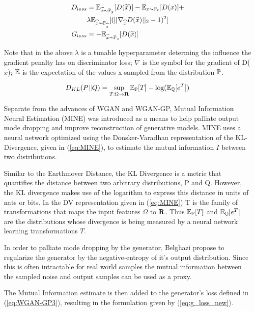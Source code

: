 \begin{align}
	D_{loss} &=  \E_{\widetilde{x} \thicksim \P_g}[D(\widetilde{x})] - \E_{x \thicksim \P_r}[D(x)] + \label{eq:WGAN-GP1} \\
	& \lambda \E_{\widehat{x} \thicksim \P_{\widehat{x}}}[(||\nabla_{\widehat{x}} D(\widehat{x})||_2 -1)^2] \label{eq:WGAN-GP2}\\
	G_{loss} &=  -\E_{\widetilde{x} \thicksim \P_g}[D(\widetilde{x})] \label{eq:WGAN-GP3}
\end{align}

Note that in the above $\lambda$ is a tunable hyperparameter determing the influence the gradient penalty has on discriminator loss; $\nabla$ is the symbol for the gradient of D($\widehat{x}$); $\E$ is the expectation of the values x sampled from the distribution $\P$.

\begin{equation}
	D_{KL}(P||Q) = \sup\limits_{T:\Omega \rightarrow \Reals} \E_\P[T] - \log(\E_\Q[e^T])
	\label{eq:MINE}
\end{equation}

Separate from the advances of WGAN and WGAN-GP, Mutual Information Neural Estimation (MINE) \cite{Belghazi2018} was introduced as a means to help palliate output mode dropping and improve reconstruction of generative models. MINE uses a neural network optimized using the Donsker-Varadhan representation of the KL-Divergence, given in (\ref{eq:MINE}), to estimate the mutual information $I$ between two distributions. 

Similar to the Earthmover Distance, the KL Divergence is a metric that quantifies the distance between two arbitrary distributions, P and Q. However, the KL divergence makes use of the logarithm to express this distance in units of nats or bits. In the DV representation given in (\ref{eq:MINE}) T is the family of transformations that maps the input features $\Omega$ to $\Reals$. Thus  $\E_\P[T]$ and $\E_\Q[e^T]$ are the distributions whose divergence is being measured by a neural network learning transformations $T$. 

In order to palliate mode dropping by the generator, Belghazi \etal \cite{Belghazi2018} propose to regularize the generator by the negative-entropy of it's output distribution. Since this is often intractable for real world samples the mutual information between the sampled noise and output samples can be used as a proxy.

The Mutual Information estimate is then added to the generator's loss defined in (\ref{eq:WGAN-GP3}), resulting in the formulation given by (\ref{eq:g_loss_new}).

